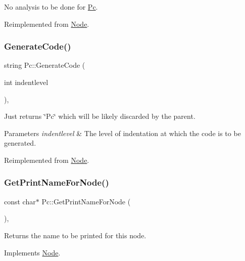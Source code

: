 No analysis to be done for \hyperlink{class_pc}{Pc}. 

Reimplemented from \hyperlink{class_node_a5f88d55c6f253a29def7ccc443d83d47}{Node}.

\mbox{\label{class_pc_abd7a71b57da30b20ab9bb20662c9f663}} 
\subsubsection{\texorpdfstring{Generate\+Code()}{GenerateCode()}}
{\footnotesize\ttfamily string Pc\+::\+Generate\+Code (\begin{DoxyParamCaption}\item[{int}]{indentlevel }\end{DoxyParamCaption})\hspace{0.3cm}{\ttfamily [inline]}, {\ttfamily [virtual]}}

Just returns \char`\"{}\+Pc\char`\"{} which will be likely discarded by the parent. 
\begin{DoxyParams}{Parameters}
{\em indentlevel} & The level of indentation at which the code is to be generated. \\
\hline
\end{DoxyParams}


Reimplemented from \hyperlink{class_node_acb60e526730e8436056375a3055c2c32}{Node}.

\mbox{\label{class_pc_aa1b66bab13f8d0a36a95369571630303}} 
\subsubsection{\texorpdfstring{Get\+Print\+Name\+For\+Node()}{GetPrintNameForNode()}}
{\footnotesize\ttfamily const char$\ast$ Pc\+::\+Get\+Print\+Name\+For\+Node (\begin{DoxyParamCaption}{ }\end{DoxyParamCaption})\hspace{0.3cm}{\ttfamily [inline]}, {\ttfamily [virtual]}}

Returns the name to be printed for this node. 

Implements \hyperlink{class_node_a56e29657306ffb004d69c6929ae44269}{Node}.

